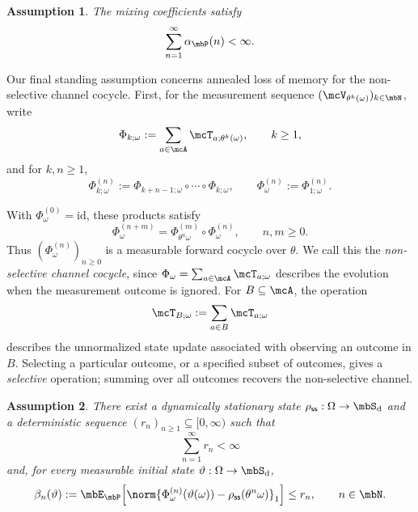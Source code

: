 \documentclass[a4paper]{article}
\numberwithin{equation}{section}   %
\theoremstyle{plain}   %
\theoremstyle{plain}   %
\newtheorem{assumption}{Assumption}     %
\theoremstyle{examplestyle}
\DeclareMathOperator{\states}{\mbS_d}   %
\DeclareMathOperator{\pr}{\mbP}           %
\newcommand{\s}{\rho_{\mathsf{ss}}}     %
\begin{document}
    \begin{assumption}
    \label{assumption_mixing_base}
        The mixing coefficients satisfy
        \[
            \sum_{n=1}^{\infty}
            \alpha_{\pr}(n)
            <
            \infty.
        \]
    \end{assumption}

    Our final standing assumption concerns annealed loss of memory for the non-selective channel cocycle.
    First, for the measurement sequence \((\mcV_{\theta^k(\omega)})_{k\in \mbN}\), write 
    \[
        \Phi_{k;\omega}:=\sum_{a\in\mcA}\mcT_{a;\theta^k(\omega)},
        \qquad k\ge1,
    \]
    and for \(k,n\ge1\),
    \[
        \Phi^{(n)}_{k;\omega}
        :=
        \Phi_{k+n-1;\omega}\circ\cdots\circ\Phi_{k;\omega},
        \qquad
        \Phi^{(n)}_\omega:=\Phi^{(n)}_{1;\omega}.
    \]

    With $\Phi^{(0)}_\omega=\mathrm{id}$, these products satisfy
    \[
        \Phi^{(n+m)}_\omega
        =\Phi^{(m)}_{\theta^n\omega}\circ\Phi^{(n)}_\omega,
        \qquad n,m\ge0.
    \]
    Thus $(\Phi^{(n)}_\omega)_{n\ge0}$ is a measurable forward cocycle over $\theta$. 
    We call this the \emph{non-selective channel cocycle}, since $\Phi_\omega=\sum_{a\in\mcA}\mcT_{a;\omega}$ describes the evolution when the measurement outcome is ignored.
    For $B\subseteq\mcA$, the operation
    \[
        \mcT_{B;\omega}:=\sum_{a\in B}\mcT_{a;\omega}
    \]
    describes the unnormalized state update associated with observing an outcome in $B$.
    Selecting a particular outcome, or a specified subset of outcomes, gives a \emph{selective} operation; summing over all outcomes recovers the non-selective channel.
    
    \begin{assumption}
    \label{assumption:forgetting}
        There exist a dynamically stationary state \(\s:\Omega\to\states\) and a deterministic sequence \((r_n)_{n\ge1}\subseteq[0,\infty)\) such that
        \[
            \sum_{n=1}^{\infty}
            r_n
            <
            \infty
        \]
        and, for every measurable initial state \(\vartheta:\Omega\to\states\),
        \[
            \beta_n(\vartheta)
            :=
            \mbE_{\pr}\!\left[
                \norm{
                    \Phi^{(n)}_\omega(\vartheta(\omega))
                    -
                    \s(\theta^n\omega)
                }_1
            \right]
            \le
            r_n,
            \qquad n\in\mbN.
        \]
    \end{assumption}
\end{document}
